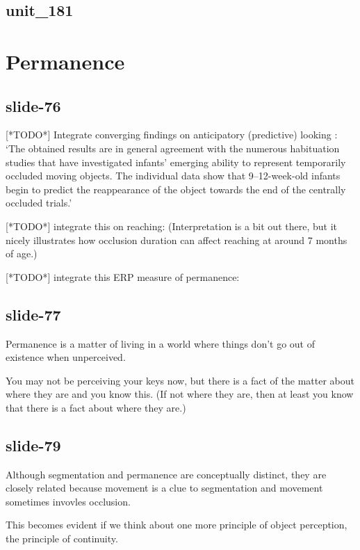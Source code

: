 \documentclass[12pt,\papersize]{extarticle}
\begin{document}
\subsection{unit\_181}
 
 
\section{Permanence}
 
\subsection{slide-76}
[*TODO*] Integrate converging findings on anticipatory (predictive) looking 
\citep{rosander:2004_infants}: `The obtained results are in general agreement with the numerous 
habituation studies that have investigated infants' emerging ability to represent temporarily 
occluded moving objects. The individual data show that 9–12-week-old infants begin to predict 
the reappearance of the object towards the end of the centrally occluded trials.'
 
[*TODO*] integrate this on reaching: \citep{vanwermeskerken:2011_anticipatory}
(Interpretation is a bit out there, but it nicely illustrates how occlusion duration
can affect reaching at around 7 months of age.)
 
[*TODO*] integrate this ERP measure of permanence: \citep{kaufman:2005_oscillatory}
 
\subsection{slide-77}
Permanence is a matter of living in a world where things don't go out of existence when unperceived.
 
You may not be perceiving your keys now, but there is a fact of the matter about where they are and you know this.  (If not where they are, then at least you know that there is a fact about where they are.)
 
\subsection{slide-79}
Although segmentation and permanence are conceptually distinct, they are closely related 
because movement is a clue to segmentation and movement sometimes invovles occlusion.
 
This becomes evident if we think about one more principle of object perception, the principle of continuity.
 
\end{document}
